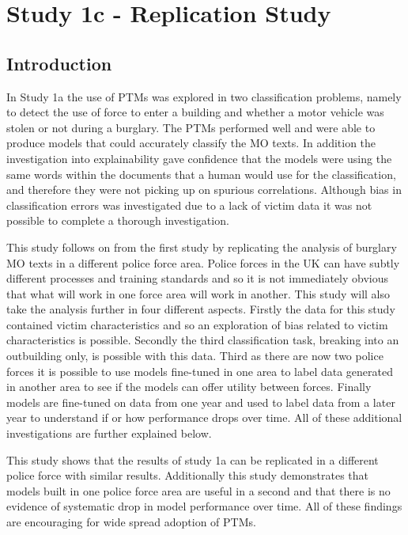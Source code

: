 \chapter{Study 1c - Replication Study}

\section{Introduction} In Study 1a the use of PTMs was explored in two classification problems, namely to detect the use of force to enter a building and whether a motor vehicle was stolen or not during a burglary. The PTMs performed well and were able to produce models that could accurately classify the MO texts. In addition the investigation into explainability gave confidence that the models were using the same words within the documents that a human would use for the classification, and therefore they were not picking up on spurious correlations. Although bias in classification errors was investigated due to a lack of victim data it was not possible to complete a thorough investigation.

This study follows on from the first study by replicating the analysis of burglary MO texts in a different police force area. Police forces in the UK can have subtly different processes and training standards and so it is not immediately obvious that what will work in one force area will work in another. This study will also take the analysis further in four different aspects. Firstly the data for this study contained victim characteristics and so an exploration of bias related to victim characteristics is possible. Secondly the third classification task, breaking into an outbuilding only, is possible with this data. Third as there are now two police forces it is possible to use models fine-tuned in one area to label data generated in another area to see if the models can offer utility between forces. Finally models are fine-tuned on data from one year and used to label data from a later year to understand if or how performance drops over time. All of these additional investigations are further explained below.

This study shows that the results of study 1a can be replicated in a different police force with similar results. Additionally this study demonstrates that models built in one police force area are useful in a second and that there is no evidence of systematic drop in model performance over time. All of these findings are encouraging for wide spread adoption of PTMs.

